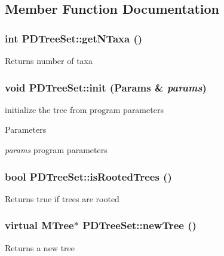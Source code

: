 \subsection{Member Function Documentation}
\hypertarget{classPDTreeSet_a9ae4ee3a64ffc0556514a9ea206b9949}{
\subsubsection[{getNTaxa}]{\setlength{\rightskip}{0pt plus 5cm}int PDTreeSet::getNTaxa ()}}
\label{classPDTreeSet_a9ae4ee3a64ffc0556514a9ea206b9949}
\begin{DoxyReturn}{Returns}
number of taxa 
\end{DoxyReturn}
\hypertarget{classPDTreeSet_aabbf34120793461a61cb099aa1095cf2}{
\subsubsection[{init}]{\setlength{\rightskip}{0pt plus 5cm}void PDTreeSet::init ({\bf Params} \& {\em params})}}
\label{classPDTreeSet_aabbf34120793461a61cb099aa1095cf2}
initialize the tree from program parameters 
\begin{DoxyParams}{Parameters}
\item[{\em params}]program parameters \end{DoxyParams}
\hypertarget{classPDTreeSet_ac7e97a1b3130b4b06ce154db0d8f50b9}{
\subsubsection[{isRootedTrees}]{\setlength{\rightskip}{0pt plus 5cm}bool PDTreeSet::isRootedTrees ()}}
\label{classPDTreeSet_ac7e97a1b3130b4b06ce154db0d8f50b9}
\begin{DoxyReturn}{Returns}
true if trees are rooted 
\end{DoxyReturn}
\hypertarget{classPDTreeSet_a0af6b254e9faff292db3684ec6089e24}{
\subsubsection[{newTree}]{\setlength{\rightskip}{0pt plus 5cm}virtual {\bf MTree}$\ast$ PDTreeSet::newTree ()}}
\label{classPDTreeSet_a0af6b254e9faff292db3684ec6089e24}
\begin{DoxyReturn}{Returns}
a new tree 
\end{DoxyReturn}


